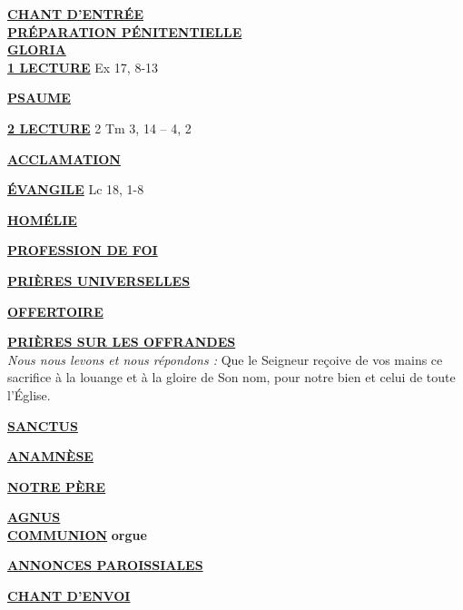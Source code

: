 \documentclass[french,11pt]{article}
\newcommand*{\chants}{../chants}
\newcommand*{\messe}{../messe_du_peuple_de_dieu}
\newcommand*{\pu}{../pu}
\newcommand*{\psaumes}{../psaumes}
\newcommand{\NewsItem}[1]{%
\vspace{3pt}
\underline{\textbf{#1}}
		  }
\begin{document}
\NewsItem{CHANT D'ENTRÉE}\\
	

\NewsItem{PRÉPARATION PÉNITENTIELLE}\\
	

\NewsItem{GLORIA}\\
	


\NewsItem{1\iere{} LECTURE} Ex 17, 8-13

\NewsItem{PSAUME}


\NewsItem{2\ieme{} LECTURE} 2 Tm 3, 14 – 4, 2

\NewsItem{ACCLAMATION}


\NewsItem{ÉVANGILE} Lc 18, 1-8

\NewsItem{HOMÉLIE}

\NewsItem{PROFESSION DE FOI}
%


\NewsItem{PRIÈRES UNIVERSELLES}

%

\NewsItem{OFFERTOIRE}

\NewsItem{PRIÈRES SUR LES OFFRANDES}\\
\textit{Nous nous levons et nous répondons : }
Que le Seigneur reçoive de vos mains ce sacrifice à la louange et à la gloire
de Son nom, pour notre bien et celui de toute l’Église.


\NewsItem{SANCTUS}


\NewsItem{ANAMNÈSE}


\NewsItem{NOTRE PÈRE}

\NewsItem{AGNUS} \\


\NewsItem{COMMUNION} \textbf{orgue}
%

\NewsItem{ANNONCES PAROISSIALES}


\NewsItem{CHANT D'ENVOI}


\newpage

\end{document}
